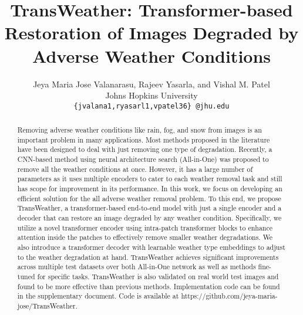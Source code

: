 \documentclass[10pt,twocolumn,letterpaper]{article}
\begin{document}
	
\title{TransWeather: Transformer-based Restoration of Images Degraded by Adverse Weather Conditions   }


	\author{Jeya Maria Jose Valanarasu, Rajeev Yasarla, and Vishal M. Patel\\
		Johns Hopkins University\\
		
		{\tt\small \{jvalana1,ryasarl1,vpatel36\} @jhu.edu}
}
\maketitle
\vspace{-2em}
\begin{abstract}
	Removing adverse weather conditions like rain, fog, and snow from images is an important problem in many applications. Most methods proposed in the literature have been designed to deal with just removing one type of degradation. Recently, a CNN-based method  using neural architecture search (All-in-One) was proposed  to remove all the weather conditions at once. However, it has a large number of parameters as it uses multiple encoders to cater to each weather removal task and still has scope for improvement in its performance. In this work, we focus on developing an efficient solution for the all adverse weather removal problem. To this end, we propose TransWeather, a transformer-based end-to-end model with just a single encoder and a decoder that can restore an image degraded by any weather condition. Specifically, we utilize a novel transformer encoder using intra-patch transformer blocks to enhance attention inside the patches to effectively remove smaller weather degradations. We also introduce a transformer decoder with learnable weather type embeddings to adjust to the weather degradation at hand. TransWeather achieves significant improvements across multiple test datasets over both All-in-One network as well as methods fine-tuned for specific tasks. TransWeather is also validated on real world test images and  found to be more effective than previous methods. Implementation code can be found in the supplementary document. Code is available at https://github.com/jeya-maria-jose/TransWeather.         
	
\end{abstract}
\end{document}
